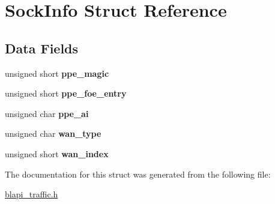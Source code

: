 \hypertarget{structSockInfo}{}\section{Sock\+Info Struct Reference}
\label{structSockInfo}
\subsection*{Data Fields}
\begin{DoxyCompactItemize}
\item 
\mbox{\label{structSockInfo_a6bd6bb2f75a8ee988f135d72bf2bc29e}} 
unsigned short {\bfseries ppe\+\_\+magic}
\item 
\mbox{\label{structSockInfo_a9ad262ff702b1714ed17ef83791e8570}} 
unsigned short {\bfseries ppe\+\_\+foe\+\_\+entry}
\item 
\mbox{\label{structSockInfo_a12c5fca90102d43d4c73a25375e13d44}} 
unsigned char {\bfseries ppe\+\_\+ai}
\item 
\mbox{\label{structSockInfo_aae261fa7a08e7dfa14012d648a31fafc}} 
unsigned char {\bfseries wan\+\_\+type}
\item 
\mbox{\label{structSockInfo_a25258f098a61c7ef44f5e14c6db5733d}} 
unsigned short {\bfseries wan\+\_\+index}
\end{DoxyCompactItemize}


The documentation for this struct was generated from the following file\+:\begin{DoxyCompactItemize}
\item 
\hyperlink{blapi__traffic_8h}{blapi\+\_\+traffic.\+h}\end{DoxyCompactItemize}
